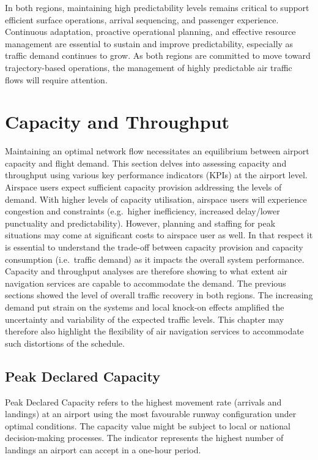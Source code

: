 \documentclass[
  a4paper,
  DIV=11,
  numbers=noendperiod]{scrreport}
\begin{document}
In both regions, maintaining high predictability levels remains critical
to support efficient surface operations, arrival sequencing, and
passenger experience. Continuous adaptation, proactive operational
planning, and effective resource management are essential to sustain and
improve predictability, especially as traffic demand continues to grow.
As both regions are committed to move toward trajectory-based
operations, the management of highly predictable air traffic flows will
require attention.


\chapter{Capacity and Throughput}\label{capacity-and-throughput}

Maintaining an optimal network flow necessitates an equilibrium between
airport capacity and flight demand. This section delves into assessing
capacity and throughput using various key performance indicators (KPIs)
at the airport level. Airspace users expect sufficient capacity
provision addressing the levels of demand. With higher levels of
capacity utilisation, airspace users will experience congestion and
constraints (e.g.~higher inefficiency, increased delay/lower punctuality
and predictability). However, planning and staffing for peak situations
may come at significant costs to airspace user as well. In that respect
it is essential to understand the trade-off between capacity provision
and capacity consumption (i.e.~traffic demand) as it impacts the overall
system performance. Capacity and throughput analyses are therefore
showing to what extent air navigation services are capable to
accommodate the demand. The previous sections showed the level of
overall traffic recovery in both regions. The increasing demand put
strain on the systems and local knock-on effects amplified the
uncertainty and variability of the expected traffic levels. This chapter
may therefore also highlight the flexibility of air navigation services
to accommodate such distortions of the schedule.

\section{Peak Declared Capacity}\label{peak-declared-capacity}

Peak Declared Capacity refers to the highest movement rate (arrivals and
landings) at an airport using the most favourable runway configuration
under optimal conditions. The capacity value might be subject to local
or national decision-making processes. The indicator represents the
highest number of landings an airport can accept in a one-hour period.
\end{document}
